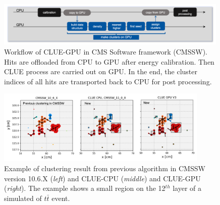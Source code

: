 \begin{figure}[ht]
    \centering
    \includegraphics[trim=0.5cm 0cm 0.5cm 0cm, clip,width=0.99\textwidth]{chapters/HGCal/figures/chep/CMSSWFollow.png}
    \caption{ Workflow of CLUE-GPU in CMS Software framework (CMSSW). Hits are offloaded from CPU to GPU after energy calibration. Then CLUE process are carried out on GPU. In the end, the cluster indices of all hits are transported back to CPU for post processing.}
    \label{fig:cmssw}
\end{figure}


\begin{figure}[ht]
    \centering
    \includegraphics[trim=0cm 0cm 0cm 0cm, clip, width=0.90\textwidth]{chapters/HGCal/figures/chep/results.png}
    \caption{ Example of clustering result from previous algorithm in CMSSW version 10.6.X (\emph{left}) and CLUE-CPU (\emph{middle}) and CLUE-GPU (\emph{right}). The example shows a small region on the 12$^{th}$ layer of a simulated of $t\bar{t}$ event.
    }
    \label{fig:results}
\end{figure}

